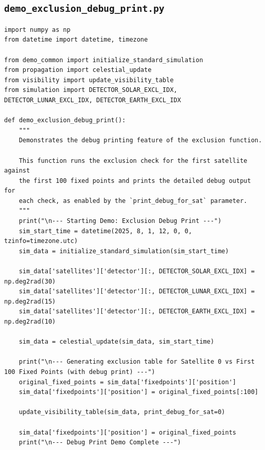 \documentclass[11pt]{article}
\begin{document}
\subsection{\texttt{demo\_exclusion\_debug\_print.py}}
\begin{Verbatim}
import numpy as np
from datetime import datetime, timezone

from demo_common import initialize_standard_simulation
from propagation import celestial_update
from visibility import update_visibility_table
from simulation import DETECTOR_SOLAR_EXCL_IDX, DETECTOR_LUNAR_EXCL_IDX, DETECTOR_EARTH_EXCL_IDX

def demo_exclusion_debug_print():
    """
    Demonstrates the debug printing feature of the exclusion function.

    This function runs the exclusion check for the first satellite against
    the first 100 fixed points and prints the detailed debug output for
    each check, as enabled by the `print_debug_for_sat` parameter.
    """
    print("\n--- Starting Demo: Exclusion Debug Print ---")
    sim_start_time = datetime(2025, 8, 1, 12, 0, 0, tzinfo=timezone.utc)
    sim_data = initialize_standard_simulation(sim_start_time)

    sim_data['satellites']['detector'][:, DETECTOR_SOLAR_EXCL_IDX] = np.deg2rad(30)
    sim_data['satellites']['detector'][:, DETECTOR_LUNAR_EXCL_IDX] = np.deg2rad(15)
    sim_data['satellites']['detector'][:, DETECTOR_EARTH_EXCL_IDX] = np.deg2rad(10)

    sim_data = celestial_update(sim_data, sim_start_time)

    print("\n--- Generating exclusion table for Satellite 0 vs First 100 Fixed Points (with debug print) ---")
    original_fixed_points = sim_data['fixedpoints']['position']
    sim_data['fixedpoints']['position'] = original_fixed_points[:100]

    update_visibility_table(sim_data, print_debug_for_sat=0)

    sim_data['fixedpoints']['position'] = original_fixed_points
    print("\n--- Debug Print Demo Complete ---")
\end{Verbatim}
\end{document}
